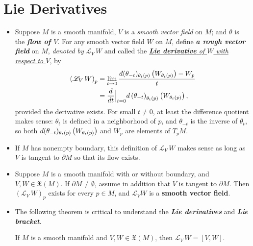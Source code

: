 \documentclass[11pt]{article}
\begin{document}
\section{Lie Derivatives}
\begin{itemize}
\item \begin{definition}
Suppose $M$ is a smooth manifold, $V$ is a \emph{smooth vector field} on $M$; and $\theta$ is the \emph{\textbf{flow of $V$}}. For any
smooth vector field $W$ on $M$, define \emph{\textbf{a rough vector field}} on $M$, \emph{denoted by} $\mathscr{L}_{V}\,W$ and called the \underline{\emph{\textbf{Lie derivative} of $W$ with respect to $V$}}, by
\begin{align}
\left(\mathscr{L}_{V}\,W\right)_{p} &= \lim_{t\rightarrow 0}\frac{ d(\theta_{-t})_{\theta_{t}(p)}\left(W_{\theta_t(p)}\right)   - W_{p}}{t} \label{eqn: lie_derivative_formula}\\
&= \frac{d}{dt}\Bigr|_{t=0} d\left(\theta_{-t}\right)_{\theta_{t}(p)}\left(W_{\theta_t(p)}\right)  \nonumber,
\end{align}
provided the derivative exists. For small $t \neq 0$, at least the difference quotient makes sense: $\theta_t$ is defined in a neighborhood of $p$, and $\theta_{-t}$ is the inverse of $\theta_t$, so both $d(\theta_{-t})_{\theta_{t}(p)}\left(W_{\theta_t(p)}\right)$ and $W_p$ are elements of $T_{p}M$.
\end{definition}

\item \begin{remark}
If $M$ has nonempty boundary, this definition of  $\mathscr{L}_{V}\,W$ makes sense as long as $V$ is tangent to $\partial M$ so that its flow exists.
\end{remark}

\item \begin{lemma}
Suppose $M$ is a smooth manifold with or without boundary, and $V, W \in \mathfrak{X}(M)$. If $\partial M \neq \emptyset$, assume in addition that $V$ is tangent to $\partial M$. Then $(\mathscr{L}_{V}\,W)_{p}$ exists for every $p \in M$, and $\mathscr{L}_{V} W$ is a \textbf{smooth vector field}.
\end{lemma}

\item The following theorem is critical to understand the \emph{\textbf{Lie derivatives}} and \emph{\textbf{Lie bracket}}.
\begin{theorem}
If $M$ is a smooth manifold and $V, W \in \mathfrak{X}(M)$, then $\mathscr{L}_{V}\,W = [V, W]$.
\end{theorem}


\end{itemize}
\end{document}
